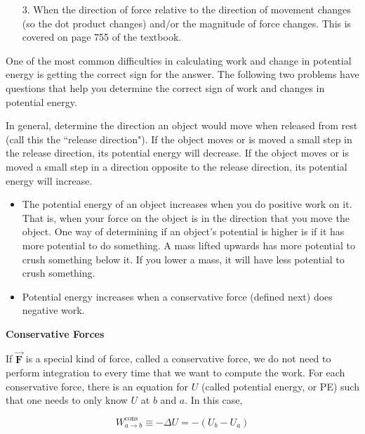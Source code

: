 \documentclass{article}
\newcommand{\bfvec}[1]{\vec{\mathbf{#1}}}
\begin{document}
\begin{enumerate}

  \item[3.] When the direction of force relative to the direction of movement changes (so the dot product changes) and/or the magnitude of force changes. This is covered on page 755 of the textbook.

\end{enumerate}

One of the most common difficulties in calculating work and change in potential energy is getting the correct sign for the answer. The following two problems have questions that help you determine the correct sign of work and changes in potential energy.

In general, determine the direction an object would move when released from rest (call this the ``release direction"). If the object moves or is moved a small step in the release direction, its potential energy will decrease. If the object moves or is moved a small step in a direction opposite to the release direction, its potential energy will increase.

\begin{itemize}

  \item The potential energy of an object increases when you do positive work on it. That is, when your force on the object is in the direction that you move the object. One way of determining if an object's potential is higher is if it has more potential to do something. A mass lifted upwards has more potential to crush something below it. If you lower a mass, it will have less potential to crush something.

  \item Potential energy increases when a conservative force (defined next) does negative work.

\end{itemize}

\textbf{Conservative Forces}

If $\bfvec{F}$ is a special kind of force, called a conservative force, we do not need to perform integration to every time that we want to compute the work. For each conservative force, there is an equation for $U$ (called potential energy, or PE) such that one needs to only know $U$ at $b$ and $a$. In this case,

\begin{equation}
W_{a\rightarrow b}^{\text{cons}} \equiv -\Delta U = -(U_b-U_a)
\end{equation}
\end{document}
